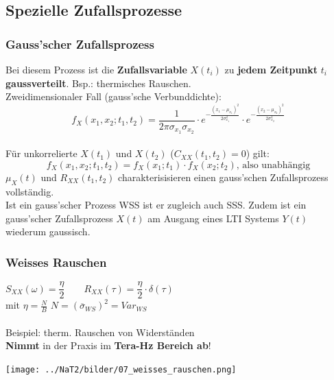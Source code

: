 \subsection{Spezielle Zufallsprozesse }
\subsubsection{Gauss'scher Zufallsprozess }
Bei diesem Prozess ist die \textbf{Zufallsvariable} $X(t_{i})$ zu \textbf{jedem Zeitpunkt} $t_{i}$
\textbf{gaussverteilt}. Bsp.: thermisches Rauschen. \\
Zweidimensionaler Fall (gauss'sche Verbunddichte): 
       $$f_{X}(x_{1},x_{2};t_{1},t_{2}) = \frac{1}{2\pi \sigma_{x_{1}}\sigma_{x_{2}}} \cdot
                                      e^{-\frac{(x_{1}-\mu_{x_{1}})^{2}}{2 \sigma^{2}_{x_{1}}}} \cdot
                                      e^{-\frac{(x_{2}-\mu_{x_{2}})^{2}}{2 \sigma^{2}_{x_{2}}}}$$ \\
Für unkorrelierte $X(t_{1})$ und $X(t_{2})$  ($C_{XX}(t_{1},t_{2})=0$) gilt:
        $$f_{X}(x_{1},x_{2}; t_{1},t_{2}) = f_{X}(x_{1};t_{1}) \cdot f_{X}(x_{2};t_{2}) \text{, also unabhängig} $$
$\mu_{X}(t)$ und $R_{XX}(t_{1}, t_{2})$ charakterisisieren einen gauss'schen Zufallsprozess
        vollst\"andig. \\
Ist ein gauss'scher Prozess WSS ist er zugleich auch SSS. Zudem ist ein gauss'scher
Zufallsprozess $X(t)$ am Ausgang eines LTI Systems $Y(t)$ wiederum gaussisch.

\subsubsection{Weisses Rauschen  }
\begin{center}
	\begin{minipage}{8cm}
		$S_{XX}(\omega) = \dfrac{\eta}{2} \qquad R_{XX}(\tau) = \dfrac{\eta}{2} \cdot \delta(\tau)$ \\ mit $\eta = \frac{N}{B}$ \qquad $N = (\overline{\sigma}_{WS})^2 = Var_{WS}$\\ \\
		Beispiel: therm. Rauschen von Widerständen \\
		\textbf{Nimmt} in der Praxis im \textbf{Tera-Hz Bereich ab}!
  	\end{minipage}
	\begin{minipage}{10cm}
		\texttt{[image: ../NaT2/bilder/07\_weisses\_rauschen.png]}
  	\end{minipage}
\end{center}

